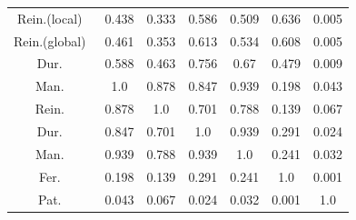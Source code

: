 \begin{table}[ht]
{\begin{tabular}{c|c c c c c c}
Rein.(local)~\cite{reinhard2002photographic} &0.438 &0.333 &0.586 &0.509 &0.636 &0.005 \\ 
Rein.(global)~\cite{reinhard2002photographic}  &0.461 &0.353 &0.613 &0.534 &0.608 &0.005 \\ 
Dur.~\cite{durand2002fast}  &0.588 &0.463 &0.756 &0.67 &0.479 &0.009 \\ 
Man.~\cite{mantiuk2006perceptual} &1.0 &0.878 &0.847 &0.939 &0.198 &0.043 \\ 
Rein.~\cite{reinhard2005dynamic}  &0.878 &1.0 &0.701 &0.788 &0.139 &0.067 \\ 
Dur.~\cite{durand2002fast}  &0.847 &0.701 &1.0 &0.939 &0.291 &0.024 \\ 
Man.~\cite{mantiuk2008display} &0.939 &0.788 &0.939 &1.0 &0.241 &0.032 \\ 
Fer.~\cite{ferradans2011analysis}  &0.198 &0.139 &0.291 &0.241 &1.0 &0.001 \\ 
Pat.~\cite{pattanaik2000time}  &0.043 &0.067 &0.024 &0.032 &0.001 &1.0 \\ 
\end{tabular}}
\end{table}

